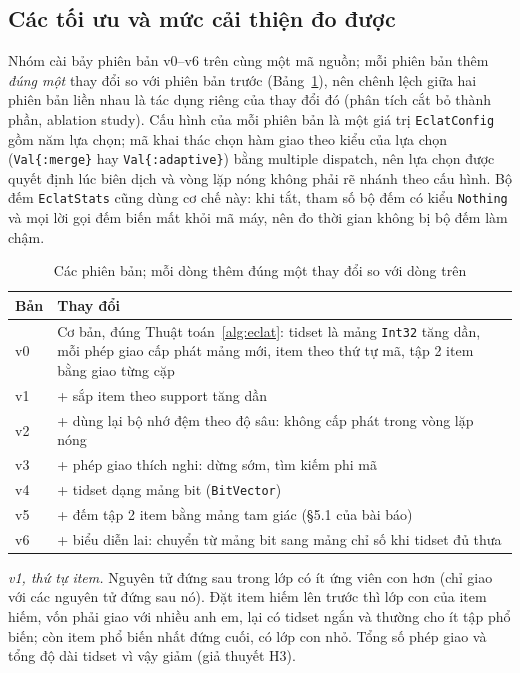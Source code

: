 \subsection{Các tối ưu và mức cải thiện đo được}
\label{sec:toi-uu}

Nhóm cài bảy phiên bản v0--v6 trên cùng một mã nguồn; mỗi phiên bản thêm \emph{đúng một} thay đổi so với phiên bản trước (Bảng~\ref{tab:b01}), nên chênh lệch giữa hai phiên bản liền nhau là tác dụng riêng của thay đổi đó (phân tích cắt bỏ thành phần, ablation study). Cấu hình của mỗi phiên bản là một giá trị \texttt{EclatConfig} gồm năm lựa chọn; mã khai thác chọn hàm giao theo kiểu của lựa chọn (\texttt{Val\{:merge\}} hay \texttt{Val\{:adaptive\}}) bằng multiple dispatch, nên lựa chọn được quyết định lúc biên dịch và vòng lặp nóng không phải rẽ nhánh theo cấu hình. Bộ đếm \texttt{EclatStats} cũng dùng cơ chế này: khi tắt, tham số bộ đếm có kiểu \texttt{Nothing} và mọi lời gọi đếm biến mất khỏi mã máy, nên đo thời gian không bị bộ đếm làm chậm.

\begin{table}[t]
\caption{Các phiên bản; mỗi dòng thêm đúng một thay đổi so với dòng trên}
\label{tab:b01}
\centering
\footnotesize
\setlength{\tabcolsep}{3pt}
\begin{tabular}{@{}lp{6.9cm}@{}}
\toprule
Bản & Thay đổi \\
\midrule
v0 & Cơ bản, đúng Thuật toán~\ref{alg:eclat}: tidset là mảng \texttt{Int32} tăng dần, mỗi phép giao cấp phát mảng mới, item theo thứ tự mã, tập 2 item bằng giao từng cặp \\
v1 & + sắp item theo support tăng dần \\
v2 & + dùng lại bộ nhớ đệm theo độ sâu: không cấp phát trong vòng lặp nóng \\
v3 & + phép giao thích nghi: dừng sớm, tìm kiếm phi mã \\
v4 & + tidset dạng mảng bit (\texttt{BitVector}) \\
v5 & + đếm tập 2 item bằng mảng tam giác (§5.1 của bài báo) \\
v6 & + biểu diễn lai: chuyển từ mảng bit sang mảng chỉ số khi tidset đủ thưa \\
\bottomrule
\end{tabular}
\end{table}

\emph{v1, thứ tự item.} Nguyên tử đứng sau trong lớp có ít ứng viên con hơn (chỉ giao với các nguyên tử đứng sau nó). Đặt item hiếm lên trước thì lớp con của item hiếm, vốn phải giao với nhiều anh em, lại có tidset ngắn và thường cho ít tập phổ biến; còn item phổ biến nhất đứng cuối, có lớp con nhỏ. Tổng số phép giao và tổng độ dài tidset vì vậy giảm (giả thuyết H3).

